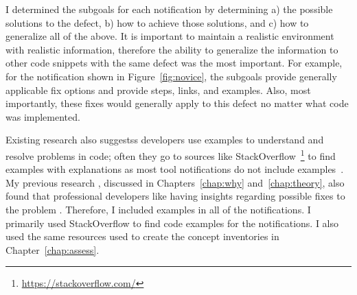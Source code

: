 I determined the subgoals for each notification by determining a) the possible solutions to the defect, b) how to achieve those solutions, and c) how to generalize all of the above.
It is important to maintain a realistic environment with realistic information, therefore the ability to generalize the information to other code snippets with the same defect was the most important. For example, for the notification shown in Figure~\ref{fig:novice}, the subgoals provide generally applicable fix options and provide steps, links, and examples. Also, most importantly, these fixes would generally apply to this defect no matter what code was implemented.

Existing research also suggestss developers use examples to understand and resolve problems in code; often they go to sources like StackOverflow~\footnote{\url{https://stackoverflow.com/}} to find examples with explanations as most tool notifications do not include examples~\cite{nasehi2012makes}.
My previous research , discussed in Chapters~\ref{chap:why} and~\ref{chap:theory}, also found that professional developers like having insights regarding possible fixes to the problem	.
Therefore, I included examples in all of the notifications. I primarily used StackOverflow to find code examples for the notifications. I also used the same resources used to create the concept inventories in Chapter~\ref{chap:assess}.







